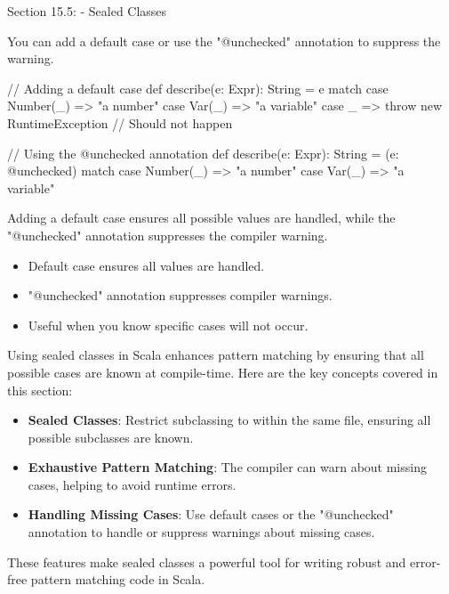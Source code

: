 \begin{notes}{Section 15.5: - Sealed Classes}
    \begin{highlight}
    
        You can add a default case or use the "@unchecked" annotation to suppress the warning.
    
    \begin{code}[Scala]
    // Adding a default case
    def describe(e: Expr): String = e match {
        case Number(_) => "a number"
        case Var(_) => "a variable"
        case _ => throw new RuntimeException // Should not happen
    }
    
    // Using the @unchecked annotation
    def describe(e: Expr): String = (e: @unchecked) match {
        case Number(_) => "a number"
        case Var(_) => "a variable"
    }
    \end{code}
    
        Adding a default case ensures all possible values are handled, while the "@unchecked" annotation suppresses the compiler warning.
        
        \begin{itemize}
            \item Default case ensures all values are handled.
            \item "@unchecked" annotation suppresses compiler warnings.
            \item Useful when you know specific cases will not occur.
        \end{itemize}
    
    \end{highlight}
    
    \begin{highlight}
    
        Using sealed classes in Scala enhances pattern matching by ensuring that all possible cases are known at compile-time. Here are the key concepts covered in this section:
        
        \begin{itemize}
            \item \textbf{Sealed Classes}: Restrict subclassing to within the same file, ensuring all possible subclasses are known.
            \item \textbf{Exhaustive Pattern Matching}: The compiler can warn about missing cases, helping to avoid runtime errors.
            \item \textbf{Handling Missing Cases}: Use default cases or the "@unchecked" annotation to handle or suppress warnings about missing cases.
        \end{itemize}
        
        These features make sealed classes a powerful tool for writing robust and error-free pattern matching code in Scala.
    
    \end{highlight}
\end{notes}